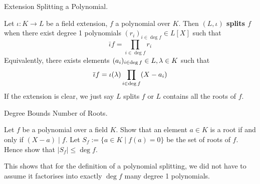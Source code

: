 \documentclass[../book.tex]{subfiles}
\begin{document}
\begin{dfn} Extension Splitting a Polynomial. 
    
    Let $\iota : K \to L$ be a field extension, $f$ a polynomial over $K$. 
    Then \textbf{$(L,\iota)$ splits $f$} when there exist degree 1 polynomials
    $(r_i)_{i\in\deg f} \in L[X]$ such that \[
        \bar\iota f = \prod_{i\in\deg f} r_i
    \]
    Equivalently, there exists elements $(a_i)_{i\in\deg f} \in L, \lambda \in K$ 
    such that \[
        \overline{\iota} f = \iota(\lambda)\prod_{i\in\deg f} (X - a_i)
    \]
    If the extension is clear, we just say $L$ splits $f$ or
    $L$ contains all the roots of $f$. 
\end{dfn}

\begin{ex} Degree Bounds Number of Roots. 

    Let $f$ be a polynomial over a field $K$.
    Show that an element $a \in K$ is a root if and only if $(X-a) \mid f$.
    Let $S_f := \{a \in K \mid f(a) = 0\}$ be the set of roots of $f$. 
    Hence show that $|S_f| \leq \deg f$.
    
    This shows that for the definition of a polynomial splitting, 
    we did not have to assume it factorises into exactly $\deg f$ many 
    degree 1 polynomials. 
\end{ex}
\end{document}
